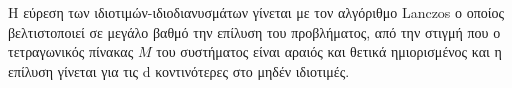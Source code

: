 %
Η εύρεση των ιδιοτιμών-ιδιοδιανυσμάτων γίνεται με τον αλγόριθμο \textlatin{Lanczos}\textlatin{\cite{lanczos}} ο οποίος βελτιστοποιεί σε μεγάλο βαθμό την επίλυση του προβλήματος, από την στιγμή που ο τετραγωνικός πίνακας $M$ του συστήματος είναι αραιός και θετικά ημιορισμένος και η επίλυση γίνεται για τις \textlatin{d} κοντινότερες στο μηδέν ιδιοτιμές.